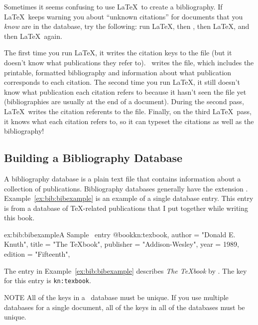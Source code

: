 Sometimes it seems confusing to use \LaTeX\ to create a bibliography.
If \LaTeX\ keeps warning you about ``unknown citations'' for documents
that you {\em know\/} are in the database, try the following: run
\LaTeX, then \BibTeX, then \LaTeX, and then \LaTeX\ again.

The first time you run \LaTeX, it writes the citation keys to the 
 file (but it doesn't know what publications they refer to).
\BibTeX\ writes the  file, which includes the printable,
formatted bibliography and information about
what publication corresponds to each citation.  The second time
you run \LaTeX, it still doesn't know what publication
each citation refers to because it hasn't seen the  file
yet (bibliographies are usually at the end of a document).  During
the second pass, \LaTeX\ writes the citation referents to the 
file.  Finally, on the third \LaTeX\ pass, it knows what
each citation refers to, so it can typeset the citations as well
as the bibliography!
\vfill

\subsection{Building a Bibliography Database}

A bibliography 
database is 
a plain text file that contains information
about a collection of publications.  Bibliography databases generally
have the extension .  Example~\ref{ex:bib:bibexample}
is an example of a single database entry.  This entry is from a database
of \TeX-related publications that I put together while writing this book.

\begin{example}{ex:bib:bibexample}{A Sample \protect\BibTeX\ entry}
@book{kn:texbook,
  author =  "Donald E. Knuth",
  title =   "The {\TeX}book",
  publisher =   "Addison-Wesley",
  year =  1989,
  edition =   "Fifteenth",
}
\end{example}

The entry in Example~\ref{ex:bib:bibexample} describes {\it The {\TeX}book\/}
by .  The key for 
this entry is \verb|kn:texbook|.

\begin{note}{NOTE}
All of the keys in a \BibTeX\ database must be unique.  If you use
multiple databases for a single document, all of the keys in all of the
databases must be unique.
\end{note}

